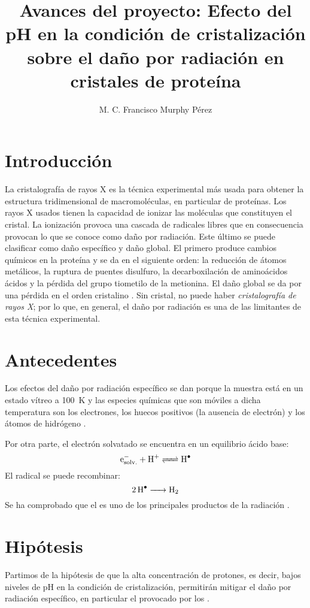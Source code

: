 \documentclass[11pt,letterpaper]{article}
\author{M. C. Francisco Murphy Pérez}
\title{Avances del proyecto: Efecto del pH en la condición de
cristalización sobre el daño por radiación
en cristales de proteína}
\begin{document}
	\maketitle
	\section{Introducción}	
	La cristalografía de rayos X es la técnica experimental más usada para obtener la estructura tridimensional de macromoléculas, en particular de proteínas. Los rayos X usados tienen la capacidad de ionizar las moléculas que constituyen el cristal. La ionización provoca una cascada de radicales libres que en consecuencia provocan lo que se conoce como daño por radiación. Este último se puede clasificar como daño específico y daño global. El primero produce cambios químicos en la proteína y se da en el siguiente orden: la reducción de átomos metálicos, la ruptura de puentes disulfuro, la decarboxilación de aminoácidos ácidos y la pérdida del grupo tiometilo de la metionina. El daño global se da por una pérdida en el orden cristalino \cite{Weik2000,Ravelli2000}. Sin cristal, no puede haber \emph{cristalografía de rayos X}; por lo que, en general, el daño por radiación es una de las limitantes de esta técnica experimental.
	
	\section{Antecedentes}
	Los efectos del daño por radiación específico se dan porque la muestra está en un estado vítreo a \SI{100}{\kelvin} y las especies químicas que son móviles a dicha temperatura son los electrones, los huecos positivos (la ausencia de electrón) y los átomos de hidrógeno \cite{Owen2012a}. 
	
	Por otra parte, el electrón solvatado se encuentra en un equilibrio ácido base:
	\begin{equation*}
		\ce{e^{-}_{solv.} + H^{+} <=> H^{.}}
	\end{equation*}
	El radical  se puede recombinar:
	\begin{equation*}
		\ce{2H^{.}      ->        H2}
	\end{equation*} 
	Se ha comprobado que el  es uno de los principales productos de la radiación \cite{Meents2010}.
	
	\section{Hipótesis}
	Partimos de la hipótesis de que la alta concentración de protones, es decir, bajos niveles de pH en la condición de cristalización, permitirán mitigar el daño por radiación específico, en particular el provocado por los .
	
\end{document}
